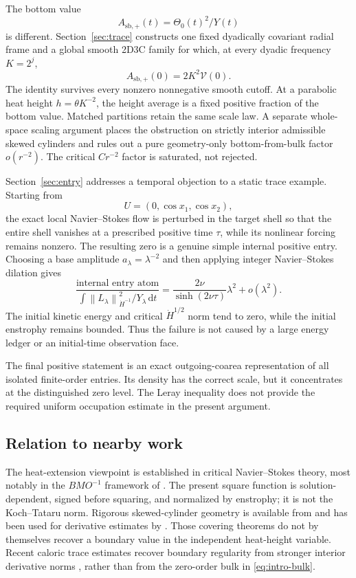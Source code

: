 \documentclass[11pt]{article}
\theoremstyle{definition}
\newcommand{\norm}[1]{\left\lVert #1\right\rVert}
\newcommand{\dd}{\,\mathrm d}
\begin{document}
The bottom value
\[
 A_{\mathrm{sb},+}(t)=\Theta_0(t)^2/Y(t)
\]
is different.  Section~\ref{sec:trace} constructs one fixed dyadically
covariant radial frame and a global smooth 2D3C family for which, at every
dyadic frequency \(K=2^j\),
\begin{equation}\label{eq:intro-trace}
 A_{\mathrm{sb},+}(0)=2K^2\mathcal V(0).
\end{equation}
The identity survives every nonzero nonnegative smooth cutoff.  At a
parabolic heat height \(h=\theta K^{-2}\), the height average is a fixed
positive fraction of the bottom value.  Matched partitions retain the same
scale law.  A separate whole-space scaling argument places the obstruction
on strictly interior admissible skewed cylinders and rules out a pure
geometry-only bottom-from-bulk factor \(o(r^{-2})\).  The critical
\(Cr^{-2}\) factor is saturated, not rejected.

Section~\ref{sec:entry} addresses a temporal objection to a static trace
example.  Starting from
\[
 U=(0,\cos x_1,\cos x_2),
\]
the exact local Navier--Stokes flow is perturbed in the target shell so that
the entire shell vanishes at a prescribed positive time \(\tau\), while its
nonlinear forcing remains nonzero.  The resulting zero is a genuine simple
internal positive entry.  Choosing a base amplitude
\(a_\lambda=\lambda^{-2}\) and then applying integer Navier--Stokes
dilation gives
\begin{equation}\label{eq:intro-payment}
 \frac{\text{internal entry atom}}
 {\displaystyle\int
   \norm{L_\lambda}_{\dot H^{-1}}^2/Y_\lambda\dd t}
 =\frac{2\nu}{\sinh(2\nu\tau)}\lambda^2+o(\lambda^2).
\end{equation}
The initial kinetic energy and critical \(\dot H^{1/2}\) norm tend to zero,
while the initial enstrophy remains bounded.  Thus the failure is not caused
by a large energy ledger or an initial-time observation face.

The final positive statement is an exact outgoing-coarea representation of
all isolated finite-order entries.  Its density has the correct scale, but it
concentrates at the distinguished zero level.  The Leray inequality does not
provide the required uniform occupation estimate in the present argument.

\subsection{Relation to nearby work}

The heat-extension viewpoint is established in critical Navier--Stokes
theory, most notably in the \(BMO^{-1}\) framework of
\citet{KochTataru2001}.  The present square function is solution-dependent,
signed before squaring, and normalized by enstrophy; it is not the
Koch--Tataru norm.  Rigorous skewed-cylinder geometry is available from
\citet{Yang2020} and has been used for derivative estimates by
\citet{VasseurYang2021}.  Those covering theorems do not by themselves
recover a boundary value in the independent heat-height variable.  Recent
caloric trace estimates recover boundary regularity from stronger interior
derivative norms \cite{ChenLiangTsai2026}, rather than from the zero-order
bulk in \eqref{eq:intro-bulk}.
\end{document}
